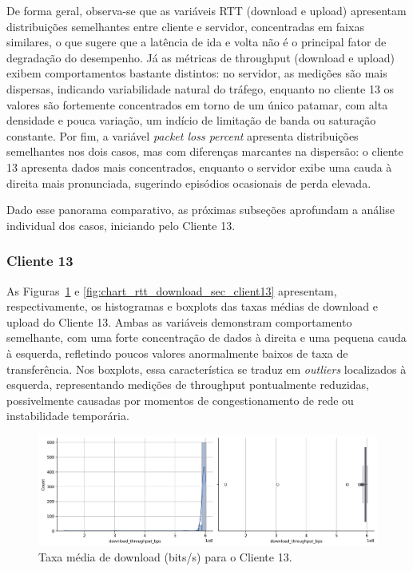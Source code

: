 \documentclass{article}
\begin{document}
De forma geral, observa-se que as variáveis RTT (download e upload) apresentam distribuições semelhantes entre cliente e servidor, concentradas em faixas similares, o que sugere que a latência de ida e volta não é o principal fator de degradação do desempenho.  
Já as métricas de throughput (download e upload) exibem comportamentos bastante distintos: no servidor, as medições são mais dispersas, indicando variabilidade natural do tráfego, enquanto no cliente 13 os valores são fortemente concentrados em torno de um único patamar, com alta densidade e pouca variação, um indício de limitação de banda ou saturação constante.  
Por fim, a variável \textit{packet loss percent} apresenta distribuições semelhantes nos dois casos, mas com diferenças marcantes na dispersão: o cliente 13 apresenta dados mais concentrados, enquanto o servidor exibe uma cauda à direita mais pronunciada, sugerindo episódios ocasionais de perda elevada.

Dado esse panorama comparativo, as próximas subseções aprofundam a análise individual dos casos, iniciando pelo Cliente 13.

\subsubsection{Cliente 13}

As Figuras~\ref{fig:chart_download_throughput_bps_client13} e \ref{fig:chart_rtt_download_sec_client13} apresentam, respectivamente, os histogramas e boxplots das taxas médias de download e upload do Cliente 13.  
Ambas as variáveis demonstram comportamento semelhante, com uma forte concentração de dados à direita e uma pequena cauda à esquerda, refletindo poucos valores anormalmente baixos de taxa de transferência.  
Nos boxplots, essa característica se traduz em \textit{outliers} localizados à esquerda, representando medições de throughput pontualmente reduzidas, possivelmente causadas por momentos de congestionamento de rede ou instabilidade temporária.

\begin{figure}
	\includegraphics[width=\textwidth]{../figures/eda/chart_download_throughput_bps_client13.png}
	\caption{Taxa média de download (bits/s) para o Cliente 13.}
	\label{fig:chart_download_throughput_bps_client13}
\end{figure}
\end{document}
